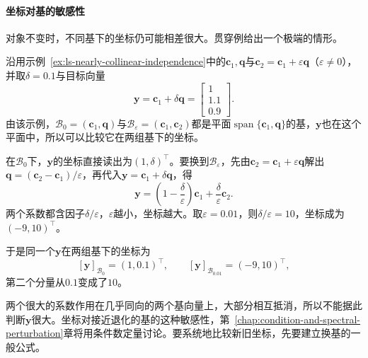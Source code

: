 \paragraph{坐标对基的敏感性}
对象不变时，不同基下的坐标仍可能相差很大。贯穿例给出一个极端的情形。
\begin{example}[近共线基下的大坐标]
\label{ex:ls-coordinate-instability}
沿用示例~\ref{ex:ls-nearly-collinear-independence}中的$\bm c_1,\bm q$与$\bm c_2=\bm c_1+\varepsilon\bm q$（$\varepsilon\neq0$），并取$\delta=0.1$与目标向量
\begin{equation}
 \bm y=\bm c_1+\delta\bm q=\begin{bmatrix}1\\1.1\\0.9\end{bmatrix}.
 \label{eq:linear-algebra-nearly-collinear-target}
\end{equation}
由该示例，$\mathcal B_0=(\bm c_1,\bm q)$与$\mathcal B_\varepsilon=(\bm c_1,\bm c_2)$都是平面$\operatorname{span}\{\bm c_1,\bm q\}$的基，$\bm y$也在这个平面中，所以可以比较它在两组基下的坐标。

在$\mathcal B_0$下，$\bm y$的坐标直接读出为$(1,\delta)^{\top}$。要换到$\mathcal B_\varepsilon$，先由$\bm c_2=\bm c_1+\varepsilon\bm q$解出$\bm q=(\bm c_2-\bm c_1)/\varepsilon$，再代入$\bm y=\bm c_1+\delta\bm q$，得
\begin{equation}
 \bm y=\left(1-\frac{\delta}{\varepsilon}\right)\bm c_1
       +\frac{\delta}{\varepsilon}\bm c_2.
 \label{eq:linear-algebra-coordinate-instability}
\end{equation}
两个系数都含因子$\delta/\varepsilon$，$\varepsilon$越小，坐标越大。取$\varepsilon=0.01$，则$\delta/\varepsilon=10$，坐标成为$(-9,10)^{\top}$。

于是同一个$\bm y$在两组基下的坐标为
\[
 [\bm y]_{\mathcal B_0}=(1,0.1)^\top,\qquad [\bm y]_{\mathcal B_{0.01}}=(-9,10)^\top,
\]
第二个分量从$0.1$变成了$10$。
\end{example}
两个很大的系数作用在几乎同向的两个基向量上，大部分相互抵消，所以不能据此判断$\bm y$很大。坐标对接近退化的基的这种敏感性，第~\ref{chap:condition-and-spectral-perturbation}章将用条件数定量讨论。要系统地比较新旧坐标，先要建立换基的一般公式。

